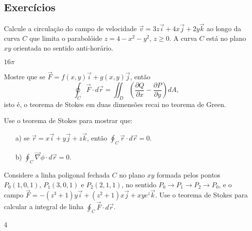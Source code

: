 \subsection*{Exercícios}
\begin{exer}
 Calcule a circulação do campo de velocidade $\vec{v}=3z\vec{i}+4x\vec{j}+2y\vec{k}$ ao longo da curva $C$ que limita o parabolóide $z=4-x^2-y^2$, $z\geq 0$. A curva $C$ está no plano $xy$ orientada no sentido anti-horário.
 \end{exer}
\begin{resp}
 $16\pi$
\end{resp}
\begin{exer}Mostre que se $\vec{F}=f(x,y)\vec{i}+g(x,y)\vec{j}$, então
$$
\oint_C  \vec{F} \cdot d\vec{r}=\iint_{D} \left(\frac{\partial Q}{\partial x} - \frac{\partial P}{\partial
y}\right) dA,
$$
isto é, o teorema de Stokes em duas dimensões recai no teorema de Green.
\end{exer}
\begin{exer}Use o teorema de Stokes para mostrar que:
\begin{itemize}
 \item[a)] se $\vec{r}=x\vec{i}+y\vec{j}+z\vec{k}$, então $\oint_C\vec{r}\cdot d\vec{r}=0$.
 \item[b)] $\oint_C\vec{\nabla}\phi\cdot d\vec{r}=0$. 
\end{itemize}
\end{exer}
\begin{exer} Considere a linha poligonal fechada $C$ no plano $xy$ formada pelos pontos $P_0(1,0,1)$, $P_1(3,0,1)$ e $P_2(2,1,1)$, no sentido $P_0\to P_1\to P_2\to P_0$, e o campo $\vec{F}=-(z^3+1)y\vec{i}+(z^2+1)x\vec{j}+xye^z\vec{k}$. Use o teorema de Stokes para calcular a integral de linha $\oint_C \vec{F}\cdot d\vec{r}$.
\end{exer}
\begin{resp}4
\end{resp}
